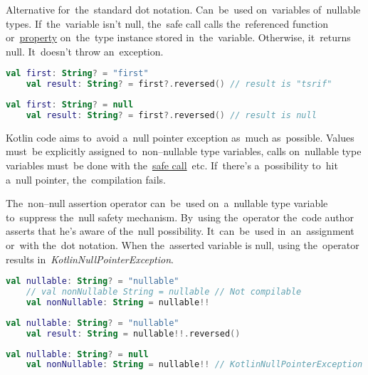 \label{kotlinsafecall}
Alternative for~the~standard dot notation.
Can~be~used on~variables of~nullable types.
If~the~variable isn't null, the~safe call calls the~referenced function or~\hyperref[variablefieldproperty]{property} on~the~type instance stored in~the~variable.
Otherwise, it~returns null.
It~doesn't throw an~exception.

\begin{lstlisting}[language=Kotlin]
    val first: String? = "first"
    val result: String? = first?.reversed() // result is "tsrif"
\end{lstlisting}

\begin{lstlisting}[language=Kotlin]
    val first: String? = null
    val result: String? = first?.reversed() // result is null
\end{lstlisting}

Kotlin code aims to~avoid a~null pointer exception as~much as~possible.
Values must~be explicitly assigned to~non--nullable type variables, calls on~nullable type variables must~be done with the~\hyperref[kotlinsafecall]{safe call}~etc.
If~there's a~possibility to~hit a~null pointer, the~compilation fails.

\mbox{The~non--null} assertion operator can~be~used on~a~nullable type variable to~suppress the~null safety mechanism.
By~using the~operator the~code author asserts that he's aware of the~null possibility.
It~can~be~used in~an~assignment or~with the~dot notation.
When the~asserted variable is null, using the~operator results \mbox{in \textit{KotlinNullPointerException}.}
\newpage

\begin{lstlisting}[language=Kotlin]
    val nullable: String? = "nullable"
    // val nonNullable String = nullable // Not compilable
    val nonNullable: String = nullable!!
\end{lstlisting}

\begin{lstlisting}[language=Kotlin]
    val nullable: String? = "nullable"
    val result: String = nullable!!.reversed()
\end{lstlisting}

\begin{lstlisting}[language=Kotlin]
    val nullable: String? = null
    val nonNullable: String = nullable!! // KotlinNullPointerException
\end{lstlisting}

